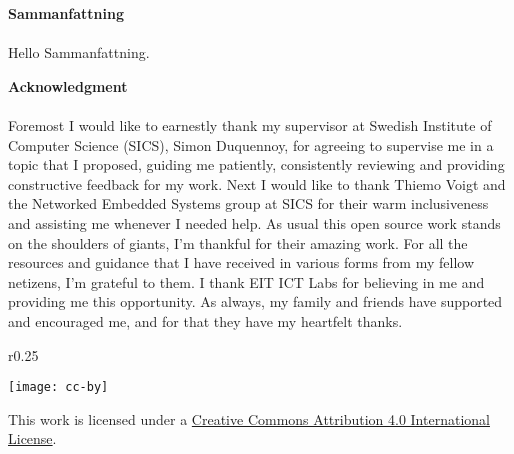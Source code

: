 
\clearpage

\newpage\null\thispagestyle{empty}\newpage

\thispagestyle{plain}
{}
\huge{\textbf{Sammanfattning}} \\
\normalsize \\
Hello Sammanfattning.
\clearpage

\newpage\null\thispagestyle{empty}\newpage

\thispagestyle{plain}
{}
\huge{\textbf{Acknowledgment}} \\
\normalsize \\


Foremost I would like to earnestly thank my supervisor at Swedish Institute of Computer Science (SICS), Simon Duquennoy, for agreeing to supervise me in a topic that I proposed, guiding me patiently, consistently reviewing and providing constructive feedback for my work. Next I would like to thank Thiemo Voigt and the Networked Embedded Systems group at SICS for their warm inclusiveness and assisting me whenever I needed help. As usual this open source work stands on the shoulders of giants, I'm thankful for their amazing work. For all the resources and guidance that I have received in various forms from my fellow netizens, I'm grateful to them. I thank EIT ICT Labs for believing in me and providing me this opportunity. As always, my family and friends have supported and encouraged me, and for that they have my heartfelt thanks.
\clearpage

\newpage\null\thispagestyle{empty}\newpage

\tableofcontents
\null
\vfill
\begin{wrapfigure}{r}{0.25\textwidth}
\vspace{-30pt}
  \begin{center}
	\texttt{[image: cc-by]}
  \end{center}
\end{wrapfigure}
\noindent
{\large This work is licensed under a \href{http://creativecommons.org/licenses/by/4.0/}{Creative Commons Attribution 4.0 International License}.}



